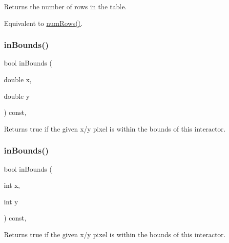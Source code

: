 Returns the number of rows in the table. 

Equivalent to \mbox{\hyperlink{classGTable_a00b7e69dd5c43e42cc91db26c459ad8b}{num\+Rows()}}. \mbox{\label{classGInteractor_afc480f652b8c5f1fb255e2269ce68879}} 
\subsubsection{\texorpdfstring{in\+Bounds()}{inBounds()}\hspace{0.1cm}{\footnotesize\ttfamily [1/2]}}
{\footnotesize\ttfamily bool in\+Bounds (\begin{DoxyParamCaption}\item[{double}]{x,  }\item[{double}]{y }\end{DoxyParamCaption}) const\hspace{0.3cm}{\ttfamily [virtual]}, {\ttfamily [inherited]}}



Returns true if the given x/y pixel is within the bounds of this interactor. 

\mbox{\label{classGInteractor_ae6d7982c1c627b677a5e776ca86118ed}} 
\subsubsection{\texorpdfstring{in\+Bounds()}{inBounds()}\hspace{0.1cm}{\footnotesize\ttfamily [2/2]}}
{\footnotesize\ttfamily bool in\+Bounds (\begin{DoxyParamCaption}\item[{int}]{x,  }\item[{int}]{y }\end{DoxyParamCaption}) const\hspace{0.3cm}{\ttfamily [virtual]}, {\ttfamily [inherited]}}



Returns true if the given x/y pixel is within the bounds of this interactor. 

\mbox{\label{classGTable_adcc2e619680a96a5b266d18a9ff2cdf4}} 
